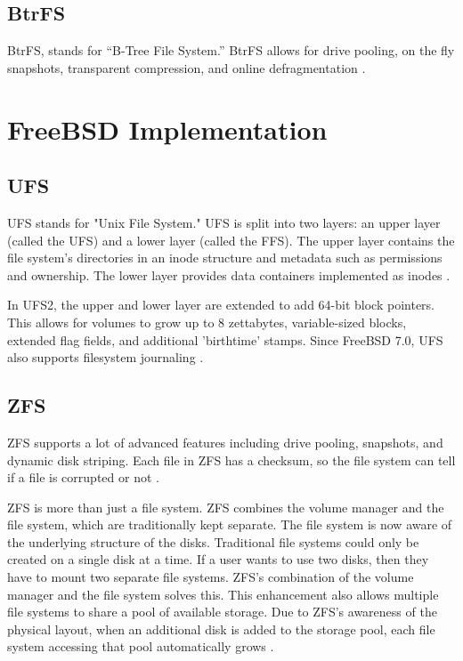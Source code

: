 \documentclass[onecolumn,draftclsnofoot, 10pt, compsoc]{IEEEtran}
\begin{document}
	\subsection{BtrFS}
		BtrFS, stands for “B-Tree File System.”
		BtrFS allows for drive pooling, on the fly snapshots, transparent compression, and online defragmentation \cite{llinuxEXT4}.
	
\section{FreeBSD Implementation}
	\subsection{UFS}
		UFS stands for "Unix File System."
		UFS is split into two layers: an upper layer (called the UFS) and a lower layer (called the FFS).
		The upper layer contains the file system's directories in an inode structure and metadata such as permissions and ownership.
		The lower layer provides data containers implemented as inodes \cite{freebsdUFS}.
		
		In UFS2, the upper and lower layer are extended to add 64-bit block pointers.
		This allows for volumes to grow up to 8 zettabytes, variable-sized blocks, extended flag fields, and additional 'birthtime' stamps. 
		Since FreeBSD 7.0, UFS also supports filesystem journaling \cite{freebsdUFS}.

	\subsection{ZFS}
		 ZFS supports a lot of advanced features including drive pooling, snapshots, and dynamic disk striping.
		 Each file in ZFS has a checksum, so the file system can tell if a file is corrupted or not \cite{llinuxEXT4}.
		 
		 ZFS is more than just a file system. 
		 ZFS combines the volume manager and the file system, which are traditionally kept separate.
		 The file system is now aware of the underlying structure of the disks. 
		 Traditional file systems could only be created on a single disk at a time. 
		 If a user wants to use two disks, then they have to mount two separate file systems. 
		 ZFS's combination of the volume manager and the file system solves this.
		 This enhancement also allows multiple file systems to share a pool of available storage. 
		 Due to ZFS's awareness of the physical layout, when an additional disk is added to the storage pool, each file system accessing that pool automatically grows \cite{freebsdZFS}.  
\end{document}
